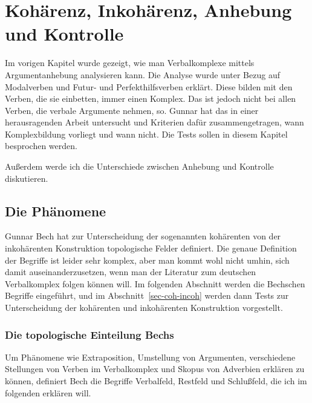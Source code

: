 

\chapter{Kohärenz, Inkohärenz, Anhebung und Kontrolle}
\label{Kapitel-anhebung}

Im vorigen Kapitel wurde gezeigt, wie man Verbalkomplexe mittels
Argumentanhebung analysieren kann. Die Analyse wurde unter Bezug auf
Modalverben und Futur- und Perfekthilfsverben erklärt. Diese bilden
mit den Verben, die sie einbetten, immer einen Komplex.
Das ist jedoch nicht bei allen Verben, die verbale Argumente nehmen,
so. Gunnar \citet{Bech55a} hat das in einer herausragenden
Arbeit untersucht und Kriterien dafür zusammengetragen,
wann Komplexbildung vorliegt und wann nicht. Die Tests sollen
in diesem Kapitel besprochen werden. 

Außerdem werde ich die Unterschiede zwischen Anhebung und Kontrolle diskutieren.

\section{Die Phänomene}


Gunnar Bech hat zur Unterscheidung der sogenannten kohärenten von der inkohärenten
Konstruktion topologische Felder definiert. Die genaue Definition der
Begriffe ist leider sehr komplex, aber man kommt wohl nicht umhin,
sich damit auseinanderzusetzen, wenn man der Literatur zum deutschen
Verbalkomplex folgen können will. Im folgenden Abschnitt werden die Bechschen
Begriffe eingeführt, und im Abschnitt~\ref{sec-coh-incoh} werden dann
Tests zur Unterscheidung der kohärenten und inkohärenten Konstruktion vorgestellt.

\subsection{Die topologische Einteilung Bechs}
\label{topo-bech}

Um Phänomene wie Extraposition, 
Umstellung von Argumenten, verschiedene Stellungen von Verben im Verbalkomplex
und Skopus von Adverbien erklären zu können, 
definiert Bech die Begriffe Verbalfeld, Restfeld und Schlußfeld, %
die ich im folgenden erklären will.

